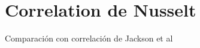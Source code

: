 \begin{figure}[H]
  \centering
  \caption{}
  \label{fig:ux-Re5000-Pr0071}
\end{figure}

\newpage
\section{Correlation de Nusselt}

%  
%
%  

Comparación con correlación de Jackson et al \cite{jackson1989studies}


